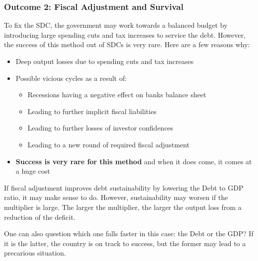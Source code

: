 \documentclass[12pt, letterpaper]{article}
\begin{document}
\subsubsection{Outcome 2: Fiscal Adjustment and Survival}
To fix the SDC, the government may work towards a balanced budget by introducing large spending cuts and tax increases to service the debt. However, the success of this method out of SDCs is very rare. Here are a few reasons why:
\begin{itemize}
	\item Deep output losses due to spending cuts and tax increases
	\item Possible vicious cycles as a result of:
		\begin{itemize}
			\item Recessions having a negative effect on banks balance sheet
			\item Leading to further implicit fiscal liabilities
			\item Leading to further losses of investor confidences
			\item Leading to a new round of required fiscal adjustment
		\end{itemize}
	\item \textbf{Success is very rare for this method} and when it does come, it comes at a huge cost
\end{itemize}
If fiscal adjustment improves debt sustainability by lowering the Debt to GDP ratio, it may make sense to do. However, sustainability may worsen if the multiplier is large. The larger the multiplier, the larger the output loss from a reduction of the deficit.

One can also question which one falls faster in this case: the Debt or the GDP? If it is the latter, the country is on track to success, but the former may lead to a precarious situation.
\end{document}
